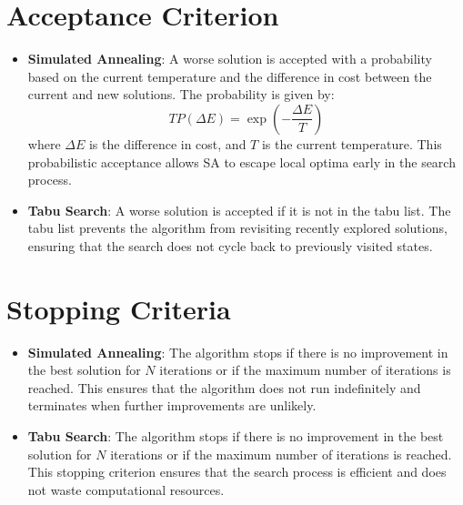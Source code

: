\documentclass{article}
\begin{document}
\section{Acceptance Criterion}
\begin{itemize}
    \item \textbf{Simulated Annealing}: A worse solution is accepted with a probability based on the current temperature and the difference in cost between the current and new solutions. The probability is given by:
    \[T
    P(\Delta E) = \exp\left(-\frac{\Delta E}{T}\right)
    \]
    where \(\Delta E\) is the difference in cost, and \(T\) is the current temperature. This probabilistic acceptance allows SA to escape local optima early in the search process.
    \item \textbf{Tabu Search}: A worse solution is accepted if it is not in the tabu list. The tabu list prevents the algorithm from revisiting recently explored solutions, ensuring that the search does not cycle back to previously visited states.
\end{itemize}

\section{Stopping Criteria}
\begin{itemize}
    \item \textbf{Simulated Annealing}: The algorithm stops if there is no improvement in the best solution for \(N\) iterations or if the maximum number of iterations is reached. This ensures that the algorithm does not run indefinitely and terminates when further improvements are unlikely.
    \item \textbf{Tabu Search}: The algorithm stops if there is no improvement in the best solution for \(N\) iterations or if the maximum number of iterations is reached. This stopping criterion ensures that the search process is efficient and does not waste computational resources.
\end{itemize}
\end{document}
